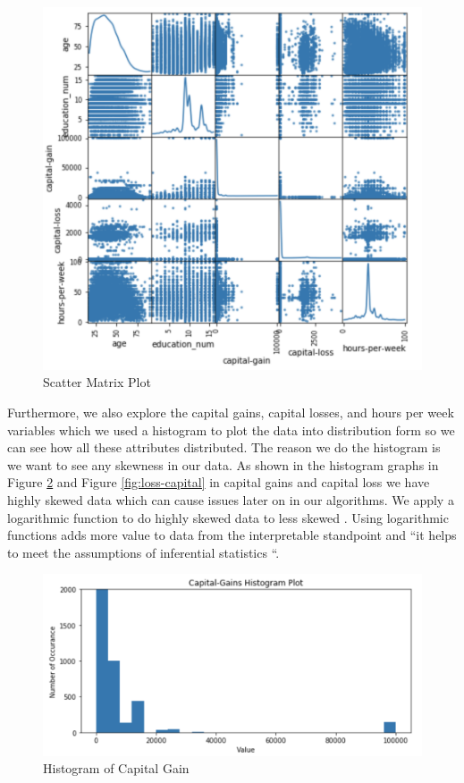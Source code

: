 \documentclass[sigconf]{acmart}
\begin{document}
 \begin{figure}[!ht]
  \centering
      \includegraphics[width=\columnwidth]{images/scatter-matrix.png}
  \caption{Scatter Matrix Plot \cite{Borga2017}}\label{fig:scatter}
\end{figure}

\par Furthermore, we also explore the capital gains, capital losses, and hours per week variables which we used a histogram to plot the data into distribution form so we can see how all these attributes distributed. The reason we do the histogram is we want to see any skewness in our data. As shown in the histogram graphs in Figure \ref{fig:Hist-capital} and  Figure \ref{fig:loss-capital} in capital gains and capital loss we have highly skewed data which can cause issues later on in our algorithms. We apply a logarithmic function to do highly skewed data to less skewed \cite{www-onlinestat}. Using logarithmic functions adds more value to data from the interpretable standpoint and ``it helps to meet the assumptions of inferential statistics \cite{www-onlinestat}``.

 \begin{figure}[!ht]
  \centering
      \includegraphics[width=\columnwidth]{images/capital-gain.png}
  \caption{Histogram of Capital Gain \cite{Borga2017}}\label{fig:Hist-capital}
\end{figure}
\end{document}
